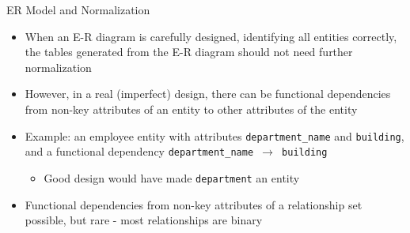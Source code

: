 \documentclass[aspectratio=169, xcolor=dvipsnames]{beamer}
\begin{document}
\begin{frame}{ER Model and Normalization}
    \begin{itemize}[<+->]
        \item When an E-R diagram is carefully designed, identifying all entities correctly, the tables generated from the E-R diagram should not need further normalization
        \item However, in a real (imperfect) design, there can be functional dependencies from non-key attributes of an entity to other attributes of the entity
        \item Example: an employee entity with attributes \texttt{department\_name} and \texttt{building}, and a functional dependency \texttt{department\_name $\rightarrow$ building}
        \begin{itemize}
            \item[$\triangleright$] Good design would have made \texttt{department} an entity
        \end{itemize}
        \item Functional dependencies from non-key attributes of a relationship set possible, but rare - most relationships are binary
    \end{itemize}
\end{frame}
\end{document}
